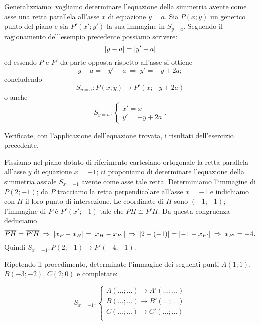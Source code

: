 Generalizziamo: vogliamo determinare l'equazione della simmetria avente come asse una retta parallela all'asse $x$ di equazione $y=a$. Sia $P(x;y)$ un generico punto del piano e sia $P'(x';y')$ la sua immagine in $S_{y=a}$. Seguendo il ragionamento dell'esempio precedente possiamo scrivere: \[\valass{y-a} = \valass{y'-a}\]
ed essendo $P$ e $P'$ da parte opposta rispetto all'asse si ottiene
\[y-a=-y'+a\:\Rightarrow\: y'=-y+2a;\]
concludendo
\[S_{y=a}:P(x;y)\rightarrow P'(x;-y+2a)\]
o anche
\[S_{y=a}:\begin{cases}x'=x\\ y'=-y+2a \end{cases}.\]

Verificate, con l'applicazione dell'equazione trovata, i risultati dell'esercizio precedente.

\begin{exrig}
\begin{esempio}
Fissiamo nel piano dotato di riferimento cartesiano ortogonale la retta parallela all'asse $y$ di equazione $x=-1$; ci proponiamo di determinare l'equazione della simmetria assiale $S_{x=-1}$ avente come asse tale retta. Determiniamo l'immagine di $P(2;-1)$; da $P$ tracciamo la retta perpendicolare all'asse $x=-1$ e indichiamo con $H$ il loro punto di intersezione. Le coordinate di $H$ sono $(-1;-1)$; l'immagine di $P$ è $P'(x';-1)$ tale che $PH\cong P'H$. Da questa congruenza deduciamo
\[\overline{PH}=\overline{P'H}\:\Rightarrow\:\valass{x_P-x_H}=\valass{x_H-x_{P'}}\:\Rightarrow\:\valass{2-(-1)}=\valass{-1-x_{P'}}\:\Rightarrow\:x_{P'}=-4.\]
Quindi $S_{x=-1}:P(2;-1)\rightarrow P'(-4;-1)$.

\begin{figure*}[!htb]
	\centering
\end{figure*}

Ripetendo il procedimento, determinate l'immagine dei seguenti punti $A(1;1)$, $B(-3;-2)$, $C(2;0)$ e completate:

\[S_{x=-1}:\begin{cases}A(\ldots{};\ldots{}) \rightarrow A'(\ldots{};\ldots{})\\
B(\ldots{};\ldots{}) \rightarrow B'(\ldots{};\ldots{})\\
C(\ldots{};\ldots{}) \rightarrow C'(\ldots{};\ldots{})\\ \end{cases}\]
\end{esempio}
\end{exrig}

